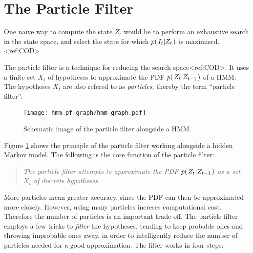 %
%

%
%

%
%


\section{The Particle Filter}

One na\"{i}ve way to compute the state $Z_t$ would be to perform an exhaustive search in the state space, and select the state for which $p{(\left. I_t \middle\vert Z_t \right.)}$ is maximised.<ref:COD> 

The particle filter is a technique for reducing the search space<ref:COD>. It uses a finite set $X_t$ of hypotheses to approximate the PDF $p{(\left. Z_t \middle\vert Z_{t-1} \right.)}$ of a HMM. The hypotheses $X_t$ are also refered to as \emph{particles}, thereby the term ``particle filter''.

\begin{figure}
  \centering
  \texttt{[image: hmm-pf-graph/hmm-graph.pdf]}
  \caption{Schematic image of the particle filter alongside a HMM.}
  \label{fig:hmm-graph}
\end{figure}

Figure \ref{fig:hmm-graph} shows the principle of the particle filter working alongside a hidden Markov model. The following is the core function of the particle filter:

\begin{quote}
  \emph{The particle filter attempts to approximate the PDF $p{(\left. Z_t \middle\vert Z_{t-1} \right.)}$ as a set $X_t$ of discrete hypotheses.}
\end{quote}

More particles mean greater accuracy, since the PDF can then be approximated more closely. However, using many particles increses computational cost.
Therefore the number of particles is an important trade-off. 
The particle filter employs a few tricks to \emph{filter} the hypotheses, 
tending to keep probable ones and throwing improbable ones away, in order to intelligently reduce the number 
of particles needed for a good approximation. The filter works in four steps:

